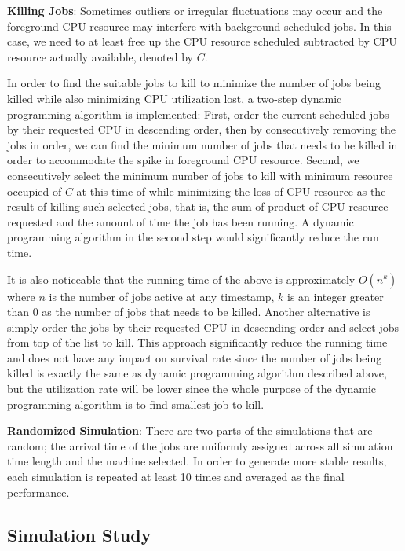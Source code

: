 \documentclass{article}
\begin{document}
\begin{flushleft}
\textbf{Killing Jobs}: Sometimes outliers or irregular fluctuations may occur
and the foreground CPU resource may interfere with background scheduled jobs. In
this case, we need to at least free up the CPU resource scheduled subtracted by
CPU resource actually available, denoted by $C$.

In order to find the suitable jobs to kill to minimize the number of jobs being
killed while also minimizing CPU utilization lost, a two-step dynamic
programming algorithm is implemented: First, order the current scheduled jobs by
their requested CPU in descending order, then by consecutively removing the jobs
in order, we can find the minimum number of jobs that needs to be killed in
order to accommodate the spike in foreground CPU resource. Second, we
consecutively select the minimum number of jobs to kill with minimum resource
occupied of $C$ at this time of while minimizing the loss of CPU resource as the
result of killing such selected jobs, that is, the sum of product of CPU
resource requested and the amount of time the job has been running. A dynamic
programming algorithm in the second step would significantly reduce the run
time.

It is also noticeable that the running time of the above is approximately
$O(n^k)$ where $n$ is the number of jobs active at any timestamp, $k$ is an
integer greater than $0$ as the number of jobs that needs to be killed. Another
alternative is simply order the jobs by their requested CPU in descending order
and select jobs from top of the list to kill. This approach significantly reduce
the running time and does not have any impact on survival rate since the number
of jobs being killed is exactly the same as dynamic programming algorithm
described above, but the utilization rate will be lower since the whole purpose
of the dynamic programming algorithm is to find smallest job to kill.

\textbf{Randomized Simulation}: There are two parts of the simulations that are
random; the arrival time of the jobs are uniformly assigned across all
simulation time length and the machine selected. In order to generate more
stable results, each simulation is repeated at least 10 times and averaged as
the final performance.
\end{flushleft}

\subsection{Simulation Study}
\end{document}
